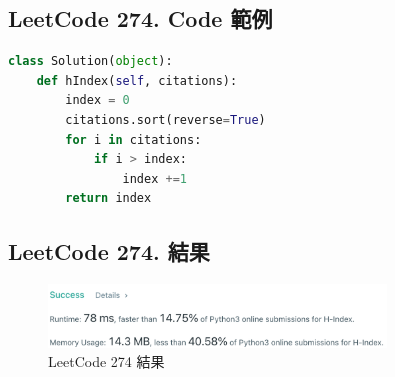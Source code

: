 \documentclass[10pt,UTF8]{ctexart}
\begin{document}
\subsection{LeetCode 274. Code 範例}

\begin{lstlisting}[language={python}]
class Solution(object):
    def hIndex(self, citations):
        index = 0
        citations.sort(reverse=True)
        for i in citations:
            if i > index:
                index +=1
        return index
\end{lstlisting}

\subsection{LeetCode 274. 結果}

\begin{figure}[H]
\centering 
\includegraphics[width=0.80\textwidth]{lc-274-o.png} 
\caption{LeetCode 274 結果}
\label{Test}
\end{figure}











\clearpage
\end{document}
